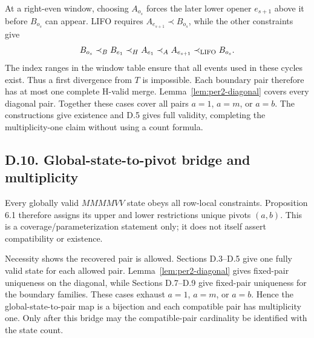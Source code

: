 \documentclass[11pt]{article}
\theoremstyle{definition}
\theoremstyle{remark}
\begin{document}
At a right-even window, choosing $A_{o_s}$ forces the later lower opener
$e_{s+1}$ above it before $B_{o_s}$ can appear. LIFO requires
$A_{e_{s+1}}\prec B_{o_s}$, while the other constraints give
\[
 B_{o_s}
 \mathrel{\prec_B} B_{e_1}
 \mathrel{\prec_H} A_{e_1}
 \mathrel{\prec_A} A_{e_{s+1}}
 \mathrel{\prec_{\rm LIFO}} B_{o_s}.
\]
The index ranges in the window table ensure that all events used in
these cycles exist. Thus a first divergence from $T$ is impossible.
Each boundary pair therefore has at most one complete H-valid merge.
Lemma~\ref{lem:per2-diagonal} covers every diagonal pair. Together these
cases cover all pairs $a=1$, $a=m$, or $a=b$. The constructions give
existence and D.5 gives full validity, completing the multiplicity-one
claim without using a count formula.

\subsection{D.10. Global-state-to-pivot bridge and
multiplicity}\label{d.10.-global-state-to-pivot-bridge-and-multiplicity}

Every globally valid \(MMMMVV\) state obeys all row-local constraints.
Proposition 6.1 therefore assigns its upper and lower restrictions
unique pivots \((a,b)\). This is a coverage/parameterization statement
only; it does not itself assert compatibility or existence.

Necessity shows the recovered pair is allowed. Sections D.3--D.5 give
one fully valid state for each allowed pair. Lemma~\ref{lem:per2-diagonal}
gives fixed-pair uniqueness on the diagonal, while Sections D.7--D.9
give fixed-pair uniqueness for the boundary families. These cases exhaust
$a=1$, $a=m$, or $a=b$. Hence the global-state-to-pair map is a
bijection and each compatible pair has multiplicity one. Only after this bridge may the compatible-pair
cardinality be identified with the state count.
\end{document}
